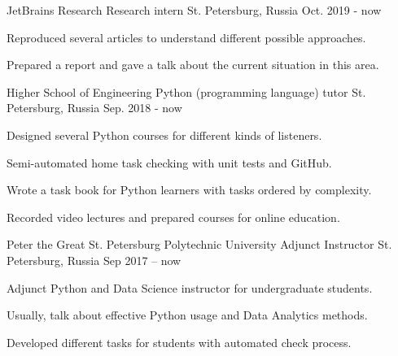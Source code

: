 

\begin{cventries}
	
  \cventry
	{JetBrains Research} %
	{Research intern} %
	{St. Petersburg, Russia} %
	{Oct. 2019 - now} %
	{
		\begin{cvitems} %
			\item {Reproduced several articles to understand different possible approaches.}
			\item {Prepared a report and gave a talk about the current situation in this area.}
		\end{cvitems}
}

  \cventry
    {Higher School of Engineering} %
    {Python (programming language) tutor} %
    {St. Petersburg, Russia} %
    {Sep. 2018 - now} %
    {
		\begin{cvitems} %
		 \item {Designed several Python courses for different kinds of listeners.}
		 \item {Semi-automated home task checking with unit tests and GitHub.}
		 \item {Wrote a task book for Python learners with tasks ordered by complexity.}
		 \item {Recorded video lectures and prepared courses for online education.}
		\end{cvitems}
    }

  \cventry
	{Peter the Great St. Petersburg Polytechnic University} %
	{Adjunct Instructor} %
	{St. Petersburg, Russia} %
	{Sep 2017 -- now} %
	{
		\begin{cvitems} %
			\item {Adjunct Python and Data Science instructor for undergraduate students.}
			\item {Usually, talk about effective Python usage and Data Analytics methods.}
			\item {Developed different tasks for students with automated check process.}
		\end{cvitems}
	}


\end{cventries}
